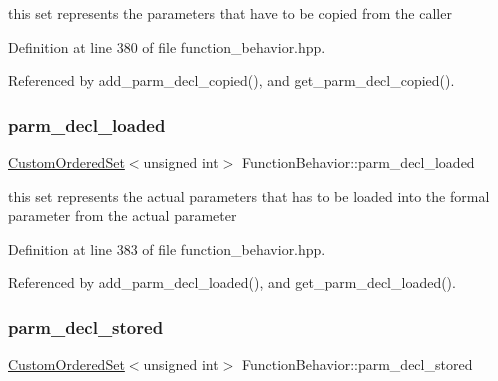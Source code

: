 this set represents the parameters that have to be copied from the caller 



Definition at line 380 of file function\+\_\+behavior.\+hpp.



Referenced by add\+\_\+parm\+\_\+decl\+\_\+copied(), and get\+\_\+parm\+\_\+decl\+\_\+copied().

\mbox{\label{classFunctionBehavior_a0cb55ed9106b19c05297c138c2c97ffc}} 
\subsubsection{\texorpdfstring{parm\+\_\+decl\+\_\+loaded}{parm\_decl\_loaded}}
{\footnotesize\ttfamily \hyperlink{classCustomOrderedSet}{Custom\+Ordered\+Set}$<$unsigned int$>$ Function\+Behavior\+::parm\+\_\+decl\+\_\+loaded\hspace{0.3cm}{\ttfamily [private]}}



this set represents the actual parameters that has to be loaded into the formal parameter from the actual parameter 



Definition at line 383 of file function\+\_\+behavior.\+hpp.



Referenced by add\+\_\+parm\+\_\+decl\+\_\+loaded(), and get\+\_\+parm\+\_\+decl\+\_\+loaded().

\mbox{\label{classFunctionBehavior_ae2419c4d1cf793c728843c68c267ee8b}} 
\subsubsection{\texorpdfstring{parm\+\_\+decl\+\_\+stored}{parm\_decl\_stored}}
{\footnotesize\ttfamily \hyperlink{classCustomOrderedSet}{Custom\+Ordered\+Set}$<$unsigned int$>$ Function\+Behavior\+::parm\+\_\+decl\+\_\+stored\hspace{0.3cm}{\ttfamily [private]}}




